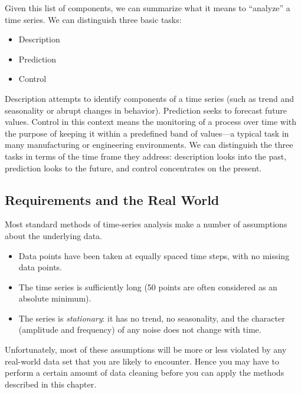 Given this list of components, we can summarize what it means to
``analyze'' a time series. We can distinguish three basic tasks:

\begin{itemize}
\item Description
\item Prediction
\item Control
\end{itemize}

Description attempts to identify components of a time series (such as
trend and seasonality or abrupt changes in behavior). Prediction seeks
to forecast future values.  Control in this context means the
monitoring of a process over time with the purpose of keeping it
within a predefined band of values---a typical task in many
manufacturing or engineering environments. We can distinguish the
three tasks in terms of the time frame they address: description looks
into the past, prediction looks to the future, and control
concentrates on the present.\vspace*{-9pt}


\subsection{Requirements and the Real World}

Most standard methods of time-series analysis make a number of
assumptions about the underlying data.

\begin{itemize}
\item Data points have been taken at equally spaced time steps, with
  no missing data points.

\item The time series is sufficiently long (50 points are often 
  considered as an absolute minimum).

\item The series is \emph{stationary}: it has no trend, no
  seasonality, and the character (amplitude and frequency) of any
  noise does not change with time.
\end{itemize}

Unfortunately, most of these assumptions will be more or less violated
by any real-world data set that you are likely to encounter. Hence you
may have to perform a certain amount of data cleaning before you can
apply the methods described in this chapter.

